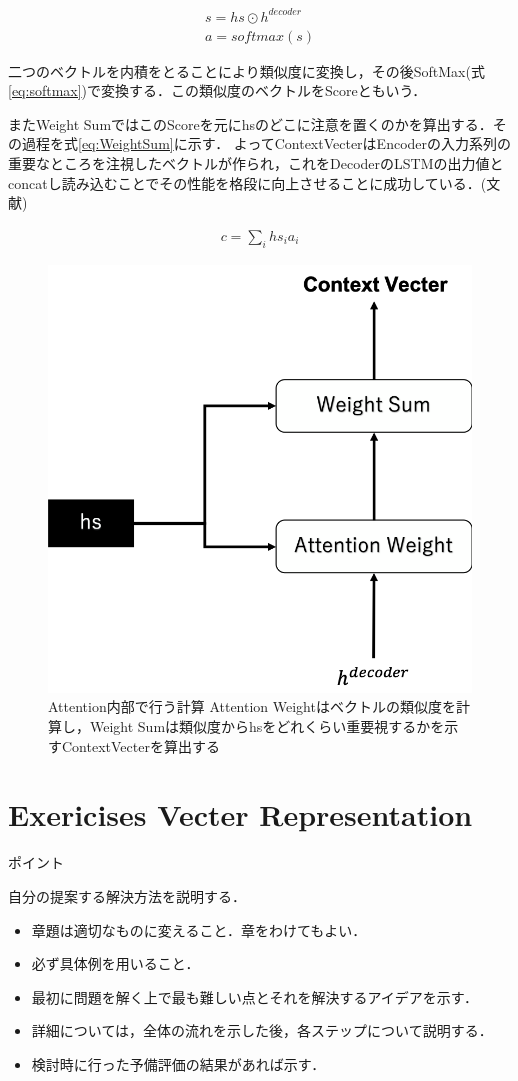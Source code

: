 \documentclass[a4j,11pt,report]{jsbook}
\newcommand{\point}[1]{
\begin{itembox}[l]{ポイント}
  #1
\end{itembox}
}
\begin{document}
\begin{equation}
  \label{eq:AttentionWeight}
  \begin{split}
    s = hs \odot h^{decoder}  \\
    a = softmax(s)
  \end{split}
\end{equation}

二つのベクトルを内積をとることにより類似度に変換し，その後SoftMax(式\ref{eq:softmax})で変換する．この類似度のベクトルをScoreともいう．

またWeight SumではこのScoreを元にhsのどこに注意を置くのかを算出する．その過程を式\ref{eq:WeightSum}に示す．
よってContextVecterはEncoderの入力系列の重要なところを注視したベクトルが作られ，これをDecoderのLSTMの出力値とconcatし読み込むことでその性能を格段に向上させることに成功している．(文献\cite{attention})


\begin{equation}
  \label{eq:WeightSum}
  \begin{split}
    c = \sum_{i} hs_{i} a_{i}
  \end{split}
\end{equation}

\begin{center}
  \begin{figure}[ht]
    \centering
    \includegraphics[width=0.5\linewidth]{image/attention_layer.png}
    \caption{Attention内部で行う計算  Attention Weightはベクトルの類似度を計算し，Weight Sumは類似度からhsをどれくらい重要視するかを示すContextVecterを算出する}
    \label{fig:Attention_layer}
  \end{figure}
\end{center}


\chapter{Exericises Vecter Representation\label{ch:method}}
\point{
自分の提案する解決方法を説明する．
\begin{itemize}
  \item 章題は適切なものに変えること．章をわけてもよい．
  \item 必ず具体例を用いること．
  \item 最初に問題を解く上で最も難しい点とそれを解決するアイデアを示す．
  \item 詳細については，全体の流れを示した後，各ステップについて説明する．
  \item 検討時に行った予備評価の結果があれば示す．
\end{itemize}
}
\fi
\end{document}
